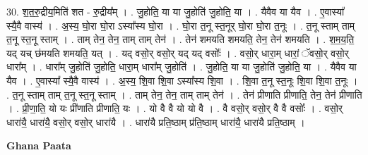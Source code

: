 \documentclass[17pt]{extarticle}
\begin{document}
30. श॒त॒रु॒द्रीय॒मिति॑ शत - रु॒द्रीय᳚म् । . जु॒होति॒ या या जु॒होति॑ जु॒होति॒ या । . यैवैव या यैव । . ए॒वास्या᳚ स्यै॒वै वास्य॑ । . अ॒स्य॒ घो॒रा घो॒रा ऽस्या᳚स्य घो॒रा । . घो॒रा त॒नू स्त॒नूर् घो॒रा घो॒रा त॒नूः । . त॒नू स्ताम् ताम् त॒नू स्त॒नू स्ताम् । . ताम् तेन॒ तेन॒ ताम् ताम् तेन॑ । . तेन॑ शमयति शमयति॒ तेन॒ तेन॑ शमयति । . श॒म॒य॒ति॒ यद् यच् छ॑मयति शमयति॒ यत् । . यद् वसो॒र् वसो॒र् यद् यद् वसोः᳚ । . वसो॒र् धारा॒म् धारां॒ ॅवसो॒र् वसो॒र् धारा᳚म् । . धारा᳚म् जु॒होति॑ जु॒होति॒ धारा॒म् धारा᳚म् जु॒होति॑ । . जु॒होति॒ या या जु॒होति॑ जु॒होति॒ या । . यैवैव या यैव । . ए॒वास्या᳚ स्यै॒वै वास्य॑ । . अ॒स्य॒ शि॒वा शि॒वा ऽस्या᳚स्य शि॒वा । . शि॒वा त॒नू स्त॒नूः शि॒वा शि॒वा त॒नूः । . त॒नू स्ताम् ताम् त॒नू स्त॒नू स्ताम् । . ताम् तेन॒ तेन॒ ताम् ताम् तेन॑ । . तेन॑ प्रीणाति प्रीणाति॒ तेन॒ तेन॑ प्रीणाति । . प्री॒णा॒ति॒ यो यः प्री॑णाति प्रीणाति॒ यः । . यो वै वै यो यो वै । . वै वसो॒र् वसो॒र् वै वै वसोः᳚ । . वसो॒र् धारा॑यै॒ धारा॑यै॒ वसो॒र् वसो॒र् धारा॑यै । . धारा॑यै प्रति॒ष्ठाम् प्र॑ति॒ष्ठाम् धारा॑यै॒ धारा॑यै प्रति॒ष्ठाम् । \newline

\textbf{Ghana Paata } \newline
\end{document}
